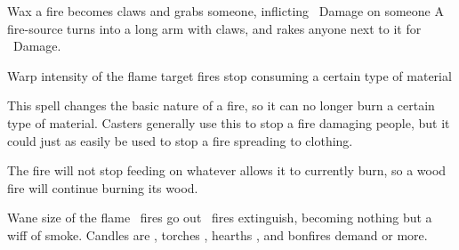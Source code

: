   {\mFire}%
  {Wax}%
  {\detailed}%
  {}%
  {a fire becomes claws and grabs someone, inflicting \rollConv\ Damage on someone}%
  {
    A fire-source turns into a long arm with claws, and rakes anyone next to it for \rollConv~Damage.
  }

  {\mFire}%
  {Warp}%
  {\duplicated}%
  {intensity of the flame}%
  {target fires stop consuming a certain type of material}%
  {
    This spell changes the basic nature of a fire, so it can no longer burn a certain type of material.
    Casters generally use this to stop a fire damaging people, but it could just as easily be used to stop a fire spreading to clothing.

    The fire will not stop feeding on whatever allows it to currently burn, so a wood fire will continue burning its wood.
  }

  {\mFire}%
  {Wane}%
  {\duplicated}%
  {size of the flame}%
  {\spellArea\ fires go out}%
  {
    \spellArea\ fires extinguish, becoming nothing but a wiff of smoke.
    Candles are , torches , hearths , and bonfires demand  or more.
  }
